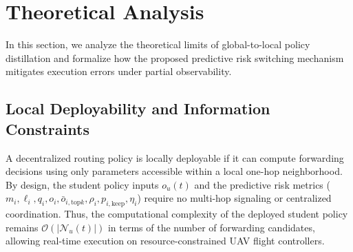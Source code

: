 \section{Theoretical Analysis}
\label{sec:analysis}

In this section, we analyze the theoretical limits of global-to-local policy distillation and formalize how the proposed predictive risk switching mechanism mitigates execution errors under partial observability.

\subsection{Local Deployability and Information Constraints}
A decentralized routing policy is locally deployable if it can compute forwarding decisions using only parameters accessible within a local one-hop neighborhood. By design, the student policy inputs $o_u(t)$ and the predictive risk metrics ($m_i, \ell_i, q_i, o_i, \bar{o}_{i,\mathrm{top}k}, \rho_i, p_{i,\mathrm{keep}}, \eta_i$) require no multi-hop signaling or centralized coordination. Thus, the computational complexity of the deployed student policy remains $\mathcal{O}(|\mathcal{N}_u(t)|)$ in terms of the number of forwarding candidates, allowing real-time execution on resource-constrained UAV flight controllers.

